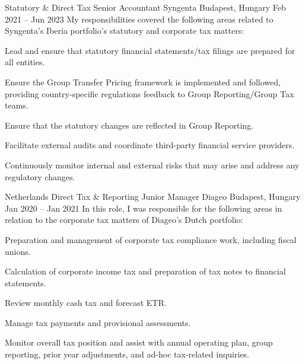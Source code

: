 \begin{cventries}
  \cventry
    {Statutory \& Direct Tax Senior Accountant} %
    {Syngenta} %
    {Budapest, Hungary} %
    {Feb 2021 -- Jun 2023} %
    {My responsibilities covered the following areas related to Syngenta's Iberia portfolio's statutory and corporate tax matters:} %
    {
      \begin{cvitems} %
        \item {Lead and ensure that statutory financial statements/tax filings are prepared for all entities.}
        \item {Ensure the Group Transfer Pricing framework is implemented and followed, providing country-specific regulations feedback to Group Reporting/Group Tax teams.}
        \item {Ensure that the statutory changes are reflected in Group Reporting.}
        \item {Facilitate external audits and coordinate third-party financial service providers.}
        \item {Continuously monitor internal and external risks that may arise and address any regulatory changes.}
      \end{cvitems}
    }


  \cventry
    {Netherlands Direct Tax \& Reporting Junior Manager} %
    {Diageo} %
    {Budapest, Hungary} %
    {Jan 2020 -- Jan 2021} %
    {In this role, I was responsible for the following areas in relation to the corporate tax matters of Diageo's Dutch portfolio:} %
    {
      \begin{cvitems} %
        \item {Preparation and management of corporate tax compliance work, including fiscal unions.}
        \item {Calculation of corporate income tax and preparation of tax notes to financial statements.}
        \item {Review monthly cash tax and forecast ETR.}
        \item {Manage tax payments and provisional assessments.}
        \item {Monitor overall tax position and assist with annual operating plan, group reporting, prior year adjustments, and ad-hoc tax-related inquiries.}
      \end{cvitems}
    }


\end{cventries}
